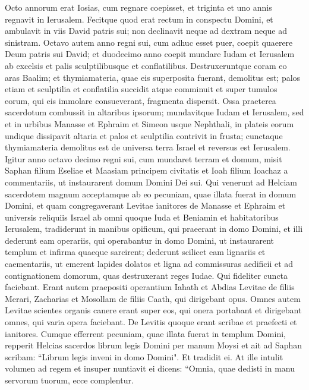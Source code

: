 \begin{biblechapter}  
\verse Octo annorum erat Iosias, cum regnare coepisset, et triginta et uno annis regnavit in Ierusalem. 
\verse Fecitque quod erat rectum in conspectu Domini, et ambulavit in viis David patris sui; non declinavit neque ad dextram neque ad sinistram. 
\verse Octavo autem anno regni sui, cum adhuc esset puer, coepit quaerere Deum patris sui David; et duodecimo anno coepit mundare Iudam et Ierusalem ab excelsis et palis sculptilibusque et conflatilibus. 
\verse Destruxeruntque coram eo aras Baalim; et thymiamateria, quae eis superposita fuerant, demolitus est; palos etiam et sculptilia et conflatilia succidit atque comminuit et super tumulos eorum, qui eis immolare consueverant, fragmenta dispersit. 
\verse Ossa praeterea sacerdotum combussit in altaribus ipsorum; mundavitque Iudam et Ierusalem, 
\verse sed et in urbibus Manasse et Ephraim et Simeon usque Nephthali, in plateis eorum undique 
\verse dissipavit altaria et palos et sculptilia contrivit in frusta; cunctaque thymiamateria demolitus est de universa terra Israel et reversus est Ierusalem. 
\verse Igitur anno octavo decimo regni sui, cum mundaret terram et domum, misit Saphan filium Eseliae et Maasiam principem civitatis et Ioah filium Ioachaz a commentariis, ut instaurarent domum Domini Dei sui. 
\verse Qui venerunt ad Helciam sacerdotem magnum acceptamque ab eo pecuniam, quae illata fuerat in domum Domini, et quam congregaverant Levitae ianitores de Manasse et Ephraim et universis reliquiis Israel ab omni quoque Iuda et Beniamin et habitatoribus Ierusalem, 
\verse tradiderunt in manibus opificum, qui praeerant in domo Domini, et illi dederunt eam operariis, qui operabantur in domo Domini, ut instaurarent templum et infirma quaeque sarcirent; 
\verse dederunt scilicet eam lignariis et caementariis, ut emerent lapides dolatos et ligna ad commissuras aedificii et ad contignationem domorum, quas destruxerant reges Iudae. 
\verse Qui fideliter cuncta faciebant. Erant autem praepositi operantium Iahath et Abdias Levitae de filiis Merari, Zacharias et Mosollam de filiis Caath, qui dirigebant opus. Omnes autem Levitae scientes organis canere 
\verse erant super eos, qui onera portabant et dirigebant omnes, qui varia opera faciebant. De Levitis quoque erant scribae et praefecti et ianitores. 
\verse Cumque efferrent pecuniam, quae illata fuerat in templum Domini, repperit Helcias sacerdos librum legis Domini per manum Moysi 
\verse et ait ad Saphan scribam: “Librum legis inveni in domo Domini". Et tradidit ei. 
\verse At ille intulit volumen ad regem et insuper nuntiavit ei dicens: “Omnia, quae dedisti in manu servorum tuorum, ecce complentur. 

\end{biblechapter}
